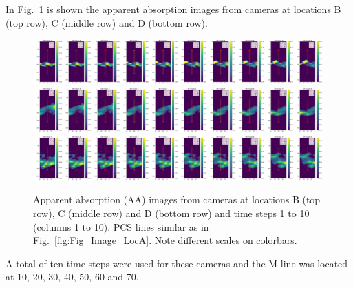 \documentclass[amtd, manuscript]{copernicus}
\begin{document}
In Fig.~\ref{fig:Fig_Image_LocV} is shown the apparent absorption
images from cameras at locations B (top row), C  (middle row) and D
(bottom row).
\begin{figure}[!htb]
  \begin{center}
    \includegraphics[width=0.99\textwidth]{Fig_Image_LocV01.png}\\
    \includegraphics[width=0.99\textwidth]{Fig_Image_LocV02.png}\\
    \includegraphics[width=0.99\textwidth]{Fig_Image_LocV03.png}\\
    \caption{\label{fig:Fig_Image_LocV}
      Apparent absorption (AA) images from cameras at locations B (top row), C
      (middle row) and D (bottom row) and time steps 1 to 10 (columns
      1 to 10). PCS lines similar as in Fig.~\ref{fig:Fig_Image_LocA}.
      Note different scales on colorbars.
    }
  \end{center}
\end{figure}
A total of ten time steps were used for these cameras and the M-line
was located at 10, 20, 30, 40, 50, 60 and 70.
\end{document}
